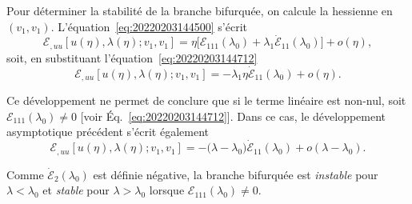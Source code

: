 \documentclass[12pt, final]{amsart}
\begin{document}
Pour déterminer la stabilité de la branche bifurquée, on calcule la hessienne
en \((v_1, v_1)\). L'équation~\eqref{eq:20220203144500} s'écrit
\begin{equation}
  \mathcal E_{,uu}[u(\eta ), \lambda (\eta ); v_1, v_1]=\eta \bigl[\mathcal E_{111}(\lambda _0)+\lambda _1\dot{\mathcal E}_{11}(\lambda _0)\bigr]+o(\eta ),
\end{equation}
soit, en substituant l'équation~\eqref{eq:20220203144712}
\begin{equation}
  \mathcal E_{,uu}[u(\eta ), \lambda (\eta ); v_1, v_1]=-\lambda _1\eta \dot{\mathcal E}_{11}(\lambda _0)+o(\eta ).
\end{equation}

Ce développement ne permet de conclure que si le terme linéaire est non-nul,
soit \(\mathcal E_{111}(\lambda _0)\neq0\) [voir Éq.~\eqref{eq:20220203144712}]. Dans ce cas, le
développement asymptotique précédent s'écrit également
\begin{equation}
  \mathcal E_{,uu}[u(\eta ), \lambda (\eta ); v_1, v_1]=-\bigl(\lambda -\lambda _0\bigr)\dot{\mathcal E}_{11}(\lambda _0)+o(\lambda -\lambda _0).
\end{equation}

Comme \(\dot{\mathcal E}_2(\lambda _0)\) est définie négative, la branche bifurquée est
\emph{instable} pour \(\lambda <\lambda _0\) et \emph{stable} pour \(\lambda >\lambda _0\) lorsque
\(\mathcal E_{111}(\lambda _0)\neq0\).
\end{document}
